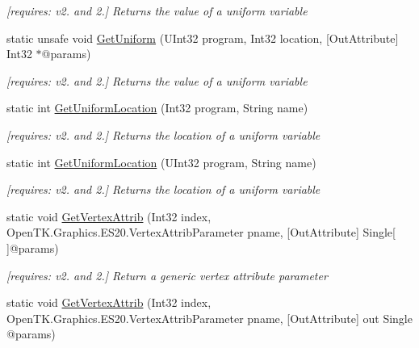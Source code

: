 \begin{DoxyCompactItemize}
\begin{DoxyCompactList}\small\item\em \mbox{[}requires\-: v2. and 2.\mbox{]} Returns the value of a uniform variable \end{DoxyCompactList}\item 
static unsafe void \hyperlink{class_open_t_k_1_1_graphics_1_1_e_s20_1_1_g_l_a0fc7d8c3c5c1c38e662c547eb5a093e9}{Get\-Uniform} (U\-Int32 program, Int32 location, \mbox{[}Out\-Attribute\mbox{]} Int32 $\ast$@params)
\begin{DoxyCompactList}\small\item\em \mbox{[}requires\-: v2. and 2.\mbox{]} Returns the value of a uniform variable \end{DoxyCompactList}\item 
static int \hyperlink{class_open_t_k_1_1_graphics_1_1_e_s20_1_1_g_l_a92a945512164ff1d295345ee8eed6830}{Get\-Uniform\-Location} (Int32 program, String name)
\begin{DoxyCompactList}\small\item\em \mbox{[}requires\-: v2. and 2.\mbox{]} Returns the location of a uniform variable \end{DoxyCompactList}\item 
static int \hyperlink{class_open_t_k_1_1_graphics_1_1_e_s20_1_1_g_l_ac08acbf509d6c4502a9327ffbc461774}{Get\-Uniform\-Location} (U\-Int32 program, String name)
\begin{DoxyCompactList}\small\item\em \mbox{[}requires\-: v2. and 2.\mbox{]} Returns the location of a uniform variable \end{DoxyCompactList}\item 
static void \hyperlink{class_open_t_k_1_1_graphics_1_1_e_s20_1_1_g_l_ad5d98803c247b64a95f85ef869ae76f0}{Get\-Vertex\-Attrib} (Int32 index, Open\-T\-K.\-Graphics.\-E\-S20.\-Vertex\-Attrib\-Parameter pname, \mbox{[}Out\-Attribute\mbox{]} Single\mbox{[}$\,$\mbox{]}@params)
\begin{DoxyCompactList}\small\item\em \mbox{[}requires\-: v2. and 2.\mbox{]} Return a generic vertex attribute parameter \end{DoxyCompactList}\item 
static void \hyperlink{class_open_t_k_1_1_graphics_1_1_e_s20_1_1_g_l_a52b8d2c8b62bdcc2930f9dcf2138e9e3}{Get\-Vertex\-Attrib} (Int32 index, Open\-T\-K.\-Graphics.\-E\-S20.\-Vertex\-Attrib\-Parameter pname, \mbox{[}Out\-Attribute\mbox{]} out Single @params)

\end{DoxyCompactItemize}
